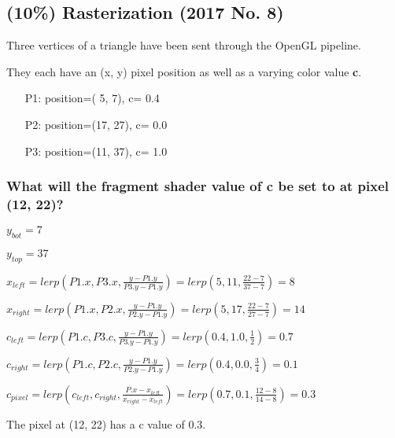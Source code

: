 \subsection{(10\%) Rasterization (2017 No. 8)}
Three vertices of a triangle have been sent through the OpenGL pipeline. 

They each have an (x, y) pixel position as well as a varying color value \textbf{c}.

\begin{enumerate}
    \item[P1:] position=( 5,  7), c= 0.4
    \item[P2:] position=(17, 27), c= 0.0
    \item[P3:] position=(11, 37), c= 1.0
\end{enumerate}

\subsubsection{What will the fragment shader value of \textbf{c} be set to at pixel (12, 22)?}


$y_{bot} = 7$

$y_{top} = 37$

$
    x_{left}
=
    lerp\left(P1.x, P3.x, \frac{y - P1.y}{P3.y - P1.y}\right)
=
    lerp\left(5, 11, \frac{22 - 7}{37 - 7}\right)
=
    8
$

$
    x_{right}
=
    lerp\left(P1.x, P2.x, \frac{y - P1.y}{P2.y - P1.y}\right)
=
    lerp\left(5, 17, \frac{22 - 7}{27 - 7}\right)
=
    14
$

$
    c_{left}
=
    lerp\left(P1.c, P3.c, \frac{y - P1.y}{P3.y - P1.y}\right)
=
    lerp\left(0.4, 1.0, \frac{1}{2}\right)
=
    0.7
$

$
    c_{right}
=
    lerp\left(P1.c, P2.c, \frac{y - P1.y}{P2.y - P1.y}\right)
=
    lerp\left(0.4, 0.0, \frac{3}{4}\right)
=
    0.1
$

$
    c_{pixel}
=
    lerp\left(c_{left}, c_{right}, \frac{P.x - x_{left}}{x_{right} - x_{left}}\right)
=
    lerp\left(0.7, 0.1, \frac{12 - 8}{14 - 8}\right)
=
    0.3
$

The pixel at (12, 22) has a c value of 0.3.